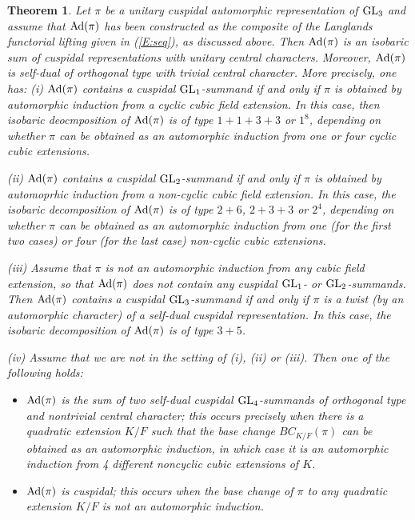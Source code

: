 \documentclass[11pt]{amsart}
\theoremstyle{plain}
\newtheorem{thm}[equation]{Theorem}
\numberwithin{equation}{section}
\def\GL{{\rm GL}}
\begin{document}
\begin{thm} \label{T:intro3}
Let $\pi$ be a unitary cuspidal automorphic representation of $\GL_3$ and assume that ${\rm Ad}(\pi)$ has been constructed as  the composite of the Langlands functorial lifting given in (\ref{E:seq}), as discussed above. 
Then ${\rm Ad}(\pi)$ is an isobaric sum of cuspidal representations with unitary central characters. Moreover, ${\rm Ad}(\pi)$  is  self-dual of orthogonal type with trivial central character.   More precisely, one has:
\vskip 5pt
\noindent (i) ${\rm Ad}(\pi)$ contains a cuspidal $\GL_1$-summand if and only if $\pi$ is obtained by automorphic induction from a cyclic cubic field extension. In this case, then isobaric deocmposition of ${\rm Ad}(\pi)$ is of type $1+1 + 3 +3$  or $1^8$, depending on whether $\pi$ can be obtained as an automorphic induction from one or four cyclic cubic extensions.
\vskip 5pt

\noindent (ii) ${\rm Ad}(\pi)$ contains a cuspidal $\GL_2$-summand if and only if $\pi$ is obtained by automoprhic induction from a non-cyclic cubic field extension. In this case, the isobaric decomposition of ${\rm Ad}(\pi)$ is of type $2+6$, $2+3+3$ or $2^4$, depending on whether $\pi$ can be obtained as an automorphic induction from one (for the first two cases) or four (for the last case) non-cyclic cubic extensions.
\vskip 5pt

\noindent (iii) Assume that $\pi$ is not an automorphic induction from any cubic field extension, so that ${\rm Ad}(\pi)$ does not contain any cuspidal $\GL_1$- or $\GL_2$-summands.
Then ${\rm Ad}(\pi)$ contains a cuspidal $\GL_3$-summand if and only if $\pi$ is a twist (by an automorphic character) of a self-dual cuspidal representation. In this case, the isobaric   decomposition of ${\rm Ad}(\pi)$ is of type $3+5$.
\vskip 5pt

\noindent (iv) Assume that we are not in the setting of (i), (ii) or (iii). 
Then one of the following holds:
\vskip 5pt
\begin{itemize}
\item[(a)] ${\rm Ad}(\pi)$ is the sum of two self-dual cuspidal $\GL_4$-summands of orthogonal type and nontrivial central character; this occurs precisely when there is a quadratic extension $K/F$ such that the base change $BC_{K/F}(\pi)$ can be obtained as an automorphic induction, in which case it is an automorphic induction from 4 different noncyclic cubic extensions of $K$.
\vskip 5pt

\item[(b)] ${\rm Ad}(\pi)$ is cuspidal; this occurs when the base change of $\pi$ to any quadratic extension $K/F$ is not an automorphic induction.
\end{itemize}
\vskip 5pt


\end{thm}
\end{document}

